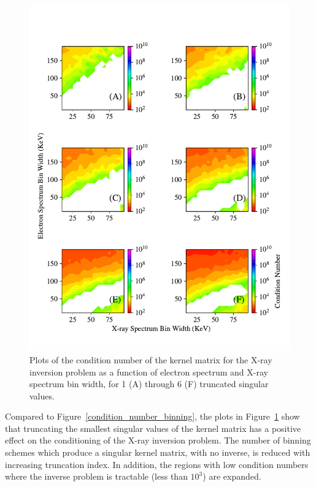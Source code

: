 \begin{figure}[p]
    \centering
    \includegraphics[width=.95\textwidth]{figures/chapter_4/condition_number_binning_tsvd/condition_number_binning_tsvd.pdf}
    \caption{Plots of the condition number of the kernel matrix for the X-ray inversion problem as a function of electron spectrum and X-ray spectrum bin width, for 1 (A) through 6 (F) truncated singular values.}
    \label{condition-number-binning-tsvd}
\end{figure}

Compared to Figure~\ref{condition_number_binning}, the plots in Figure~\ref{condition-number-binning-tsvd} show that truncating the smallest singular values of the kernel matrix has a positive effect on the conditioning of the X-ray inversion problem. The number of binning schemes which produce a singular kernel matrix, with no inverse, is reduced with increasing truncation index. In addition, the regions with low condition numbers where the inverse problem is tractable (less than $10^3$) are expanded. 

